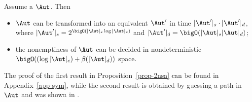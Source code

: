 \begin{proposition}\label{prop-2nsa}
Assume a \SSA{}  $\Aut$. Then
\begin{itemize}
\item $\Aut$ can be  transformed into an equivalent \SA{} $\Aut'$ in time $|\Aut'|_s \cdot |\Aut'|_d$, where $|\Aut'|_s = 2^{\bigO\left(|\Aut|_s \log |\Aut|_s\right)}$ and $|\Aut'|_d = \bigO(|\Aut|_s |\Aut|_d)$;
%
%
%
\item the nonemptiness of $\Aut$ can be decided in nondeterministic $\bigO( (\log |\Aut|_c) + \beta(|\Aut|_d))$ space.
\end{itemize}
\end{proposition}
The proof of the first result in Proposition~\ref{prop-2nsa} can be found in Appendix~\ref{app-sym}, while the second result is obtained by guessing a path in $\Aut$ and was shown in \cite{NG01,DV14}.








